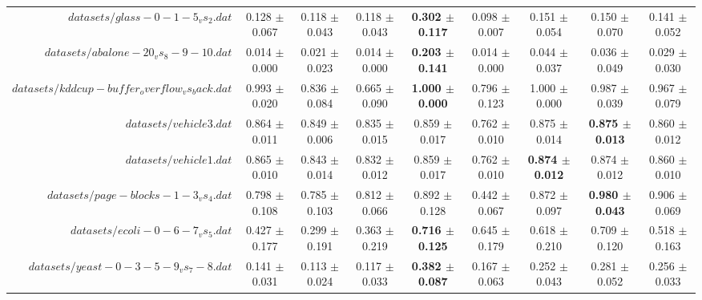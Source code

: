 \begin{table}[!ht]
{\begin{tabular}{r c c c c c c c c}
$datasets/glass-0-1-5_vs_2.dat$ & 0.128 $\pm$ 0.067 & 0.118 $\pm$ 0.043 & 0.118 $\pm$ 0.043 & \textbf{0.302 $\pm$ 0.117} & 0.098 $\pm$ 0.007 & 0.151 $\pm$ 0.054 & 0.150 $\pm$ 0.070 & 0.141 $\pm$ 0.052 \\
$datasets/abalone-20_vs_8-9-10.dat$ & 0.014 $\pm$ 0.000 & 0.021 $\pm$ 0.023 & 0.014 $\pm$ 0.000 & \textbf{0.203 $\pm$ 0.141} & 0.014 $\pm$ 0.000 & 0.044 $\pm$ 0.037 & 0.036 $\pm$ 0.049 & 0.029 $\pm$ 0.030 \\
$datasets/kddcup-buffer_overflow_vs_back.dat$ & 0.993 $\pm$ 0.020 & 0.836 $\pm$ 0.084 & 0.665 $\pm$ 0.090 & \textbf{1.000 $\pm$ 0.000} & 0.796 $\pm$ 0.123 & 1.000 $\pm$ 0.000 & 0.987 $\pm$ 0.039 & 0.967 $\pm$ 0.079 \\
$datasets/vehicle3.dat$ & 0.864 $\pm$ 0.011 & 0.849 $\pm$ 0.006 & 0.835 $\pm$ 0.015 & 0.859 $\pm$ 0.017 & 0.762 $\pm$ 0.010 & 0.875 $\pm$ 0.014 & \textbf{0.875 $\pm$ 0.013} & 0.860 $\pm$ 0.012 \\
$datasets/vehicle1.dat$ & 0.865 $\pm$ 0.010 & 0.843 $\pm$ 0.014 & 0.832 $\pm$ 0.012 & 0.859 $\pm$ 0.017 & 0.762 $\pm$ 0.010 & \textbf{0.874 $\pm$ 0.012} & 0.874 $\pm$ 0.012 & 0.860 $\pm$ 0.010 \\
$datasets/page-blocks-1-3_vs_4.dat$ & 0.798 $\pm$ 0.108 & 0.785 $\pm$ 0.103 & 0.812 $\pm$ 0.066 & 0.892 $\pm$ 0.128 & 0.442 $\pm$ 0.067 & 0.872 $\pm$ 0.097 & \textbf{0.980 $\pm$ 0.043} & 0.906 $\pm$ 0.069 \\
$datasets/ecoli-0-6-7_vs_5.dat$ & 0.427 $\pm$ 0.177 & 0.299 $\pm$ 0.191 & 0.363 $\pm$ 0.219 & \textbf{0.716 $\pm$ 0.125} & 0.645 $\pm$ 0.179 & 0.618 $\pm$ 0.210 & 0.709 $\pm$ 0.120 & 0.518 $\pm$ 0.163 \\
$datasets/yeast-0-3-5-9_vs_7-8.dat$ & 0.141 $\pm$ 0.031 & 0.113 $\pm$ 0.024 & 0.117 $\pm$ 0.033 & \textbf{0.382 $\pm$ 0.087} & 0.167 $\pm$ 0.063 & 0.252 $\pm$ 0.043 & 0.281 $\pm$ 0.052 & 0.256 $\pm$ 0.033 \\
\end{tabular}}
\end{table}
